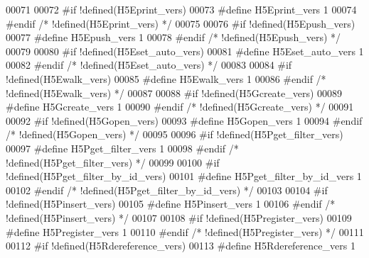 \begin{DoxyCode}
00071 
00072 \textcolor{preprocessor}{#if !defined(H5Eprint\_vers)}
00073 \textcolor{preprocessor}{  #define H5Eprint\_vers 1}
00074 \textcolor{preprocessor}{#endif }\textcolor{comment}{/* !defined(H5Eprint\_vers) */}\textcolor{preprocessor}{}
00075 
00076 \textcolor{preprocessor}{#if !defined(H5Epush\_vers)}
00077 \textcolor{preprocessor}{  #define H5Epush\_vers 1}
00078 \textcolor{preprocessor}{#endif }\textcolor{comment}{/* !defined(H5Epush\_vers) */}\textcolor{preprocessor}{}
00079 
00080 \textcolor{preprocessor}{#if !defined(H5Eset\_auto\_vers)}
00081 \textcolor{preprocessor}{  #define H5Eset\_auto\_vers 1}
00082 \textcolor{preprocessor}{#endif }\textcolor{comment}{/* !defined(H5Eset\_auto\_vers) */}\textcolor{preprocessor}{}
00083 
00084 \textcolor{preprocessor}{#if !defined(H5Ewalk\_vers)}
00085 \textcolor{preprocessor}{  #define H5Ewalk\_vers 1}
00086 \textcolor{preprocessor}{#endif }\textcolor{comment}{/* !defined(H5Ewalk\_vers) */}\textcolor{preprocessor}{}
00087 
00088 \textcolor{preprocessor}{#if !defined(H5Gcreate\_vers)}
00089 \textcolor{preprocessor}{  #define H5Gcreate\_vers 1}
00090 \textcolor{preprocessor}{#endif }\textcolor{comment}{/* !defined(H5Gcreate\_vers) */}\textcolor{preprocessor}{}
00091 
00092 \textcolor{preprocessor}{#if !defined(H5Gopen\_vers)}
00093 \textcolor{preprocessor}{  #define H5Gopen\_vers 1}
00094 \textcolor{preprocessor}{#endif }\textcolor{comment}{/* !defined(H5Gopen\_vers) */}\textcolor{preprocessor}{}
00095 
00096 \textcolor{preprocessor}{#if !defined(H5Pget\_filter\_vers)}
00097 \textcolor{preprocessor}{  #define H5Pget\_filter\_vers 1}
00098 \textcolor{preprocessor}{#endif }\textcolor{comment}{/* !defined(H5Pget\_filter\_vers) */}\textcolor{preprocessor}{}
00099 
00100 \textcolor{preprocessor}{#if !defined(H5Pget\_filter\_by\_id\_vers)}
00101 \textcolor{preprocessor}{  #define H5Pget\_filter\_by\_id\_vers 1}
00102 \textcolor{preprocessor}{#endif }\textcolor{comment}{/* !defined(H5Pget\_filter\_by\_id\_vers) */}\textcolor{preprocessor}{}
00103 
00104 \textcolor{preprocessor}{#if !defined(H5Pinsert\_vers)}
00105 \textcolor{preprocessor}{  #define H5Pinsert\_vers 1}
00106 \textcolor{preprocessor}{#endif }\textcolor{comment}{/* !defined(H5Pinsert\_vers) */}\textcolor{preprocessor}{}
00107 
00108 \textcolor{preprocessor}{#if !defined(H5Pregister\_vers)}
00109 \textcolor{preprocessor}{  #define H5Pregister\_vers 1}
00110 \textcolor{preprocessor}{#endif }\textcolor{comment}{/* !defined(H5Pregister\_vers) */}\textcolor{preprocessor}{}
00111 
00112 \textcolor{preprocessor}{#if !defined(H5Rdereference\_vers)}
00113 \textcolor{preprocessor}{  #define H5Rdereference\_vers 1}

\end{DoxyCode}
